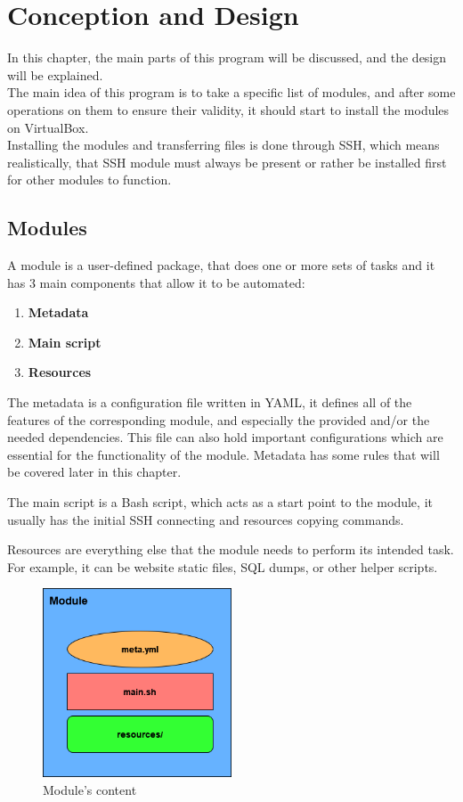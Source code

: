 \chapter{Conception and Design}
In this chapter, the main parts of this program will be discussed, and the design will be explained.\\
The main idea of this program is to take a specific list of modules, and after some operations on them to ensure their validity, it should start to install the modules on VirtualBox\cite{virtualbox}.\\
Installing the modules and transferring files is done through SSH, which means realistically, that SSH module must always be present or rather be installed first for other modules to function.

\section{Modules}
A module is a user-defined package, that does one or more sets of tasks and it has 3 main components that allow it to be automated:
\begin{enumerate}
    \item \textbf{Metadata}
    \item \textbf{Main script}
    \item \textbf{Resources}
\end{enumerate}
The metadata is a configuration file written in YAML, it defines all of the features of the corresponding module, and especially the provided and/or the needed dependencies. This file can also hold important configurations which are essential for the functionality of the module.
Metadata has some rules that will be covered later in this chapter.

The main script is a Bash script, which acts as a start point to the module, it usually has the initial SSH connecting and resources copying commands.

Resources are everything else that the module needs to perform its intended task. For example, it can be website static files, SQL dumps, or other helper scripts.
\\
\begin{figure}[!ht]
\centering
\includegraphics[width=0.5\textwidth]{resources/figures/module.png}
\caption{Module's content}
\end{figure}

